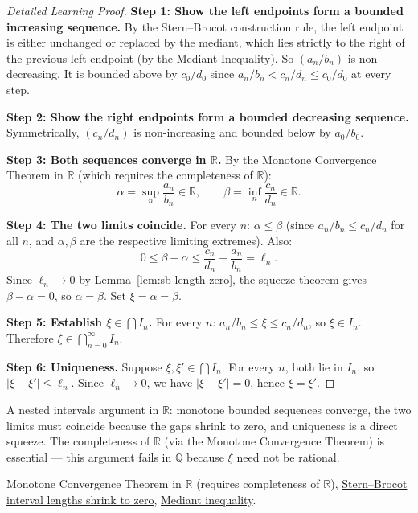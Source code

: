 \begin{proof}[Detailed Learning Proof]
\LRAProofBodyStart
\textbf{Step 1: Show the left endpoints form a bounded increasing sequence.}
By the Stern--Brocot construction rule, the left endpoint is either
unchanged or replaced by the mediant, which lies strictly to the right of
the previous left endpoint (by the Mediant Inequality).  So $(a_n/b_n)$
is non-decreasing.  It is bounded above by $c_0/d_0$ since $a_n/b_n <
c_n/d_n \leq c_0/d_0$ at every step.

\textbf{Step 2: Show the right endpoints form a bounded decreasing sequence.}
Symmetrically, $(c_n/d_n)$ is non-increasing and bounded below by $a_0/b_0$.

\textbf{Step 3: Both sequences converge in $\mathbb{R}$.}
By the Monotone Convergence Theorem in $\mathbb{R}$ (which requires the
completeness of $\mathbb{R}$):
\[
\alpha = \sup_n \frac{a_n}{b_n} \in \mathbb{R}, \qquad
\beta = \inf_n \frac{c_n}{d_n} \in \mathbb{R}.
\]

\textbf{Step 4: The two limits coincide.}
For every $n$: $\alpha \leq \beta$ (since $a_n/b_n \leq c_n/d_n$ for
all $n$, and $\alpha, \beta$ are the respective limiting extremes).
Also:
\[
0 \leq \beta - \alpha \leq \frac{c_n}{d_n} - \frac{a_n}{b_n} = \ell_n.
\]
Since $\ell_n \to 0$ by \hyperref[lem:sb-length-zero]{Lemma~\ref*{lem:sb-length-zero}},
the squeeze theorem gives $\beta - \alpha = 0$, so $\alpha = \beta$.
Set $\xi = \alpha = \beta$.

\textbf{Step 5: Establish $\xi \in \bigcap I_n$.}
For every $n$: $a_n/b_n \leq \xi \leq c_n/d_n$, so $\xi \in I_n$.
Therefore $\xi \in \bigcap_{n=0}^{\infty} I_n$.

\textbf{Step 6: Uniqueness.}
Suppose $\xi, \xi' \in \bigcap I_n$.  For every $n$, both lie in $I_n$,
so $|\xi - \xi'| \leq \ell_n$.  Since $\ell_n \to 0$, we have
$|\xi - \xi'| = 0$, hence $\xi = \xi'$.
\end{proof}

\begin{remark*}
A nested intervals argument in $\mathbb{R}$: monotone bounded sequences
converge, the two limits must coincide because the gaps shrink to zero,
and uniqueness is a direct squeeze.  The completeness of $\mathbb{R}$
(via the Monotone Convergence Theorem) is essential --- this argument
fails in $\mathbb{Q}$ because $\xi$ need not be rational.
\end{remark*}

\begin{dependencies}
Monotone Convergence Theorem in $\mathbb{R}$ (requires completeness of $\mathbb{R}$),
\hyperref[lem:sb-length-zero]{Stern--Brocot interval lengths shrink to zero},
\hyperref[thm:mediant-inequality]{Mediant inequality}.
\end{dependencies}

\clearpage
